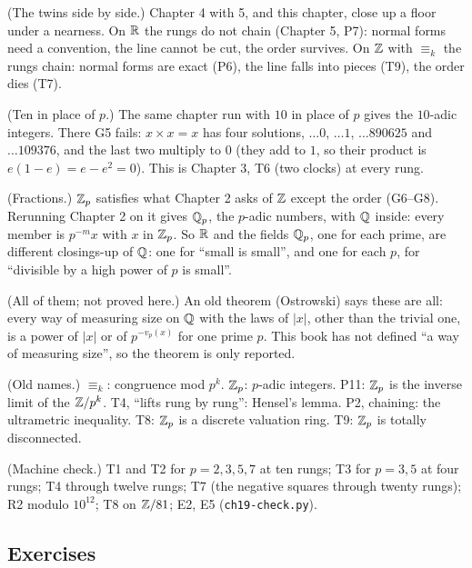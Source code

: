 \begin{lines}
\item[\lab{R1}] (The twins side by side.) Chapter 4 with 5, and this chapter, close up a floor under a nearness. On $\mathbb{R}$ the rungs do not chain (Chapter 5, P7): normal forms need a convention, the line cannot be cut, the order survives. On $\mathbb{Z}$ with $\equiv_k$ the rungs chain: normal forms are exact (P6), the line falls into pieces (T9), the order dies (T7).
\item[\lab{R2}] (Ten in place of $p$.) The same chapter run with $10$ in place of $p$ gives the $10$-adic integers. There G5 fails: $x \times x = x$ has four solutions, $\dots 0$, $\dots 1$, $\dots 890625$ and $\dots 109376$, and the last two multiply to $0$ (they add to $1$, so their product is $e(1 - e) = e - e^2 = 0$). This is Chapter 3, T6 (two clocks) at every rung.
\item[\lab{R3}] (Fractions.) $\mathbb{Z}_p$ satisfies what Chapter 2 asks of $\mathbb{Z}$ except the order (G6--G8). Rerunning Chapter 2 on it gives $\mathbb{Q}_p$, the $p$-adic numbers, with $\mathbb{Q}$ inside: every member is $p^{-m} x$ with $x$ in $\mathbb{Z}_p$. So $\mathbb{R}$ and the fields $\mathbb{Q}_p$, one for each prime, are different closings-up of $\mathbb{Q}$: one for ``small is small'', and one for each $p$, for ``divisible by a high power of $p$ is small''.
\item[\lab{R4}] (All of them; not proved here.) An old theorem (Ostrowski) says these are all: every way of measuring size on $\mathbb{Q}$ with the laws of $|x|$, other than the trivial one, is a power of $|x|$ or of $p^{-v_p(x)}$ for one prime $p$. This book has not defined ``a way of measuring size'', so the theorem is only reported.
\item[\lab{R5}] (Old names.) $\equiv_k$: congruence mod $p^k$. $\mathbb{Z}_p$: $p$-adic integers. P11: $\mathbb{Z}_p$ is the inverse limit of the $\mathbb{Z}/p^k$. T4, ``lifts rung by rung'': Hensel's lemma. P2, chaining: the ultrametric inequality. T8: $\mathbb{Z}_p$ is a discrete valuation ring. T9: $\mathbb{Z}_p$ is totally disconnected.
\item[\lab{R6}] (Machine check.) T1 and T2 for $p = 2, 3, 5, 7$ at ten rungs; T3 for $p = 3, 5$ at four rungs; T4 through twelve rungs; T7 (the negative squares through twenty rungs); R2 modulo $10^{12}$; T8 on $\mathbb{Z}/81$; E2, E5 (\texttt{ch19-check.py}).
\end{lines}

\subsection*{Exercises}

